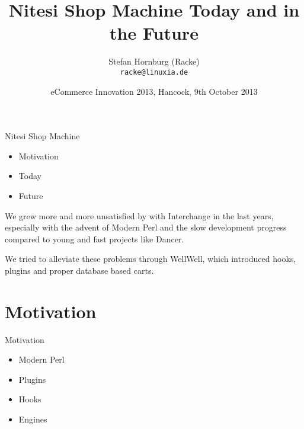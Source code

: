 \usepackage[utf8]{inputenc}
\usepackage[T1]{fontenc}
\usepackage{mathptmx}
\usepackage[scaled=.90]{helvet}
\usepackage{courier}
\usepackage{caption}
\captionsetup{labelformat=empty,labelsep=none}
\usepackage{beamerthemesplit}
\usepackage{verbatim}
\usepackage{hyperref}
\usepackage{listings}
\lstset{language=Perl,basicstyle=\normalsize,tabsize=3,showstringspaces=false}

\title{Nitesi Shop Machine Today and in the Future}
\author[racke]{Stefan Hornburg (Racke)\\ \texttt{racke@linuxia.de}}
\date{eCommerce Innovation 2013, Hancock, 9th October 2013}


\maketitle{}

\begin{frame}
  \titlepage
\end{frame}

\tableofcontents

\begin{frame}{Nitesi Shop Machine}
\begin{itemize}
\item Motivation
\item Today
\item Future
\end{itemize}
\end{frame}

We grew more and more unsatisfied by with Interchange in the last years,
especially with the advent of Modern Perl and the slow development progress
compared to young and fast projects like Dancer.

We tried to alleviate these problems through WellWell, which introduced
hooks, plugins and proper database based carts.

\section{Motivation}
\begin{frame}{Motivation}
\begin{itemize}
\item Modern Perl
\item Plugins
\item Hooks
\item Engines
\end{itemize}
\end{frame}

